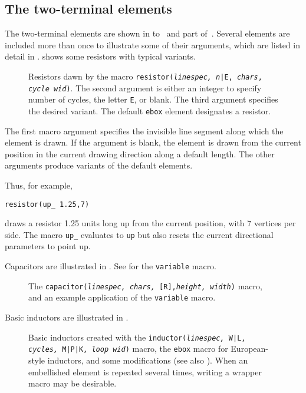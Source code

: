 \subsection{The two-terminal elements\label{Twoterminal:}}
The two-terminal elements are shown in
to~ and part of~.
Several elements are included more than once to illustrate
some of their arguments, which are listed in detail in .
 shows some resistors with typical variants.
\begin{figure}[h!]
   
   \caption{Resistors dawn by the macro
   {\tt resistor({\sl linespec, n}|E, {\sl chars}, {\sl cycle wid})}.
   The second argument is either an integer to specify number of cycles,
   the letter {\tt E}, or blank. The third argument specifies the desired
   variant.
   The default {\tt ebox} element designates a resistor.}
   \label{Resistors}
    \end{figure}

The first macro argument specifies
the invisible line segment along which the element is drawn.
If the argument is blank,
the element is drawn from the current position in the current drawing
direction along a default length.
The other arguments produce variants of the default elements.

Thus, for example,
\par
{\tt resistor(up\_ 1.25,7)}
\par
\noindent%
draws a resistor 1.25 units long up from the current position, with $7$
vertices per side.
The macro {\tt up\_} evaluates to {\tt up} but also resets the current
directional parameters to point up.

\pagebreak
Capacitors are illustrated in .
See  for the {\tt variable} macro.
\begin{figure}[h!t]
   
   \caption{The {\tt capacitor({\sl linespec, chars,} [R],{\sl height, width})}
      macro, and an example application of the {\tt variable} macro.}
   \label{Capacitors}
    \end{figure}

Basic inductors are illustrated in .
\begin{figure}[h!]
   
   \caption{Basic inductors created with the
    {\tt inductor({\sl linespec,} W|L, {\sl cycles,} M|P|K, {\sl loop wid})}
    macro, the {\tt ebox} macro for European-style inductors, and some
    modifications (see also ).
    When an embellished element is repeated several times,
    writing a wrapper macro may be desirable.}
   \label{Inductors}
    \end{figure}

